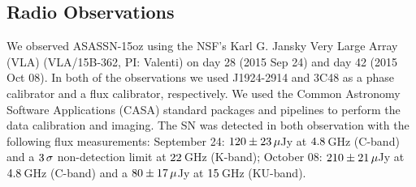 \documentclass[a4paper,fleqn,usenatbib]{mnras}
\begin{document}
\subsection{Radio Observations}
We observed ASASSN-15oz using the NSF's Karl G. Jansky Very Large Array (VLA) (VLA/15B-362, PI: Valenti) on day 28 (2015 Sep 24) and day 42 (2015 Oct 08). 
In both of the observations we used J1924-2914 and 3C48 as a phase calibrator and a flux calibrator, respectively. 
We used the Common Astronomy Software Applications (CASA) standard packages and pipelines to perform the data calibration and imaging. 
The SN was detected in both observation with the following flux measurements: September 24: $\rm{120\pm 23\,\mu}$Jy at $\rm{4.8}$\,GHz (C-band) and a $\rm{3\,\sigma}$ non-detection limit at $\rm{22}$\,GHz (K-band); October 08:  $\rm{210\pm 21\,\mu}$Jy at $\rm{4.8}$\,GHz (C-band) and a $\rm{80\pm 17\,\mu}$Jy at $\rm{15}$\,GHz (KU-band). 
\end{document}
